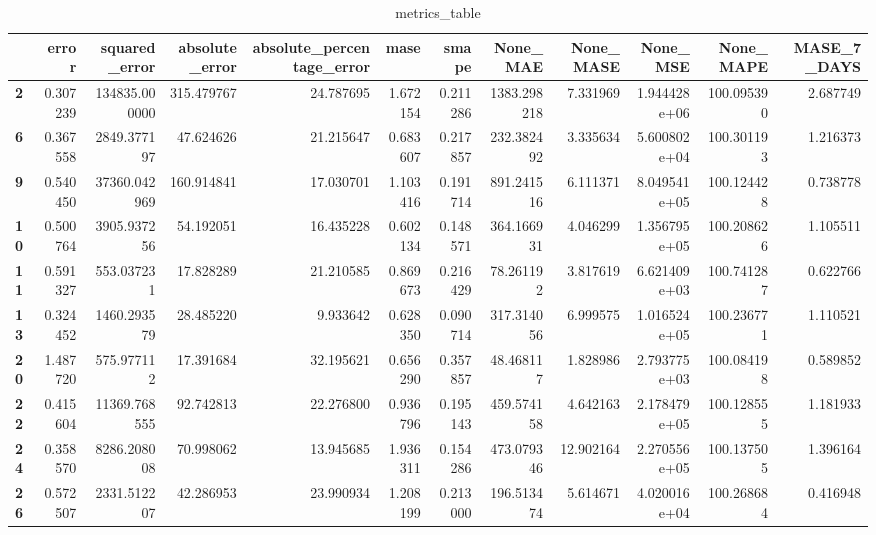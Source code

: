 \begin{table}[h]
\centering
\caption{metrics_table}
\label{table:Experiment with CNN AE and LSTM hybrid method. Local, multivariate, dataset 1. Tuned with LSTM Local Multivariate dataset 1}
\begin{tabular}{lrrrrrrrrrrr}
\toprule
{} &     error &  squared\_error &  absolute\_error &  absolute\_percentage\_error &      mase &     smape &     None\_MAE &  None\_MASE &      None\_MSE &   None\_MAPE &  MASE\_7\_DAYS \\
\midrule
\textbf{2 } &  0.307239 &  134835.000000 &      315.479767 &                  24.787695 &  1.672154 &  0.211286 &  1383.298218 &   7.331969 &  1.944428e+06 &  100.095390 &     2.687749 \\
\textbf{6 } &  0.367558 &    2849.377197 &       47.624626 &                  21.215647 &  0.683607 &  0.217857 &   232.382492 &   3.335634 &  5.600802e+04 &  100.301193 &     1.216373 \\
\textbf{9 } &  0.540450 &   37360.042969 &      160.914841 &                  17.030701 &  1.103416 &  0.191714 &   891.241516 &   6.111371 &  8.049541e+05 &  100.124428 &     0.738778 \\
\textbf{10} &  0.500764 &    3905.937256 &       54.192051 &                  16.435228 &  0.602134 &  0.148571 &   364.166931 &   4.046299 &  1.356795e+05 &  100.208626 &     1.105511 \\
\textbf{11} &  0.591327 &     553.037231 &       17.828289 &                  21.210585 &  0.869673 &  0.216429 &    78.261192 &   3.817619 &  6.621409e+03 &  100.741287 &     0.622766 \\
\textbf{13} &  0.324452 &    1460.293579 &       28.485220 &                   9.933642 &  0.628350 &  0.090714 &   317.314056 &   6.999575 &  1.016524e+05 &  100.236771 &     1.110521 \\
\textbf{20} &  1.487720 &     575.977112 &       17.391684 &                  32.195621 &  0.656290 &  0.357857 &    48.468117 &   1.828986 &  2.793775e+03 &  100.084198 &     0.589852 \\
\textbf{22} &  0.415604 &   11369.768555 &       92.742813 &                  22.276800 &  0.936796 &  0.195143 &   459.574158 &   4.642163 &  2.178479e+05 &  100.128555 &     1.181933 \\
\textbf{24} &  0.358570 &    8286.208008 &       70.998062 &                  13.945685 &  1.936311 &  0.154286 &   473.079346 &  12.902164 &  2.270556e+05 &  100.137505 &     1.396164 \\
\textbf{26} &  0.572507 &    2331.512207 &       42.286953 &                  23.990934 &  1.208199 &  0.213000 &   196.513474 &   5.614671 &  4.020016e+04 &  100.268684 &     0.416948 \\

\end{tabular}
\end{table}
